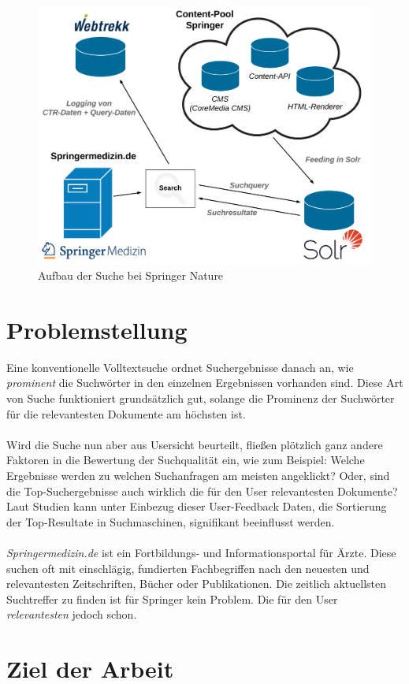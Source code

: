\begin{figure}[H]
\centering
\includegraphics[width=0.5\linewidth]{gfx/AufbauSucheSpringerNature}
\caption[Aufbau der Suche bei Springer Nature]{Aufbau der Suche bei Springer Nature}
\end{figure}

\section{Problemstellung}
\label{sec:Einfuehrung:Problemstellung}

Eine konventionelle Volltextsuche ordnet Suchergebnisse danach an, wie \textit{prominent} die Suchwörter in den einzelnen Ergebnissen vorhanden sind. Diese Art von Suche funktioniert grundsätzlich gut, solange die Prominenz der Suchwörter für die relevantesten Dokumente am höchsten ist. \cite{Bast2013}
\\
\\
Wird die Suche nun aber aus Usersicht beurteilt, fließen plötzlich ganz andere Faktoren in die Bewertung der Suchqualität ein, wie zum Beispiel: Welche Ergebnisse werden zu welchen Suchanfragen am meisten angeklickt? Oder, sind die Top-Suchergebnisse auch wirklich die für den User relevantesten Dokumente? Laut Studien kann unter Einbezug dieser User-Feedback Daten, die Sortierung der Top-Resultate in Suchmaschinen, signifikant beeinflusst werden. \cite{IWUSBI}
\\
\\
\textit{Springermedizin.de} ist ein Fortbildungs- und Informationsportal für Ärzte. Diese suchen oft mit einschlägig, fundierten Fachbegriffen nach den neuesten und relevantesten Zeitschriften, Bücher oder Publikationen. Die zeitlich aktuellsten Suchtreffer zu finden ist für Springer kein Problem. Die für den User \textit{relevantesten} jedoch schon. 

\section{Ziel der Arbeit}
\label{sec:Einfuehrung:ZielArbeit}

